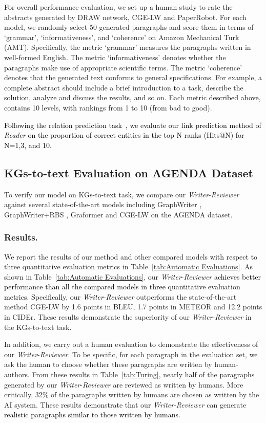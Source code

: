 \documentclass[letterpaper]{article}
\def\hmg{\textcolor{black}}
\def\wzq{\textcolor{black}}
\begin{document}
For overall performance evaluation, 
we set up a human study to rate the abstracts generated by DRAW network, CGE-LW and PaperRobot. 
For each model, we randomly select 50 generated paragraphs and score them in terms of {`grammar', `informativeness', and `coherence' on Amazon Mechanical Turk (AMT)}. 
Specifically, the metric `grammar' measures the paragraphs written in well-formed English. The metric `informativeness' denotes whether the paragraphs make use of appropriate scientific terms. The metric `coherence' denotes that the generated text conforms to general specifications. For example, a complete abstract should include a brief introduction \hmg{to} a task, describe the solution, analyze and discuss the results, and so on.
Each metric \hmg{described above}, contains 10 levels, \hmg{with} rankings from 1 to 10 (from bad to good). 

\hmg{Following the relation prediction task~\cite{Nathani2019LearningAE}, we evaluate our link prediction  method of \textit{Reader} on the proportion of correct entities in the top N ranks (Hits@N) for N=1,3, and 10.}

\subsection{KGs-to-text Evaluation on AGENDA Dataset}
To verify our model on KGs-to-text task, we compare our \textit{Writer}-\textit{Reviewer} against several state-of-the-art models including GraphWriter \cite{KoncelKedziorski2019TextGF}, GraphWriter+RBS \cite{An2019RepulsiveBS}, Graformer \cite{Schmitt2020ModelingGS} and CGE-LW \cite{ribeiro2020modeling} on the AGENDA dataset. 

\subsubsection{Results.} 
We report the results of our method and other compared models \hmg{with respect to} three quantitative evaluation metrics in Table~\ref{tab:Automatic Evaluations}. As shown in Table~\ref{tab:Automatic Evaluations},
our \textit{Writer}-\textit{Reviewer} \wzq{achieves better performance than all the compared models in three quantitative evaluation metrics.
Specifically, our \textit{Writer}-\textit{Reviewer}} outperforms the 
state-of-the-art method
CGE-LW by 1.6 points in BLEU, 1.7 points in METEOR and 12.2 points in CIDEr. 
These results demonstrate the superiority of our \textit{Writer}-\textit{Reviewer} in the KGs-to-text task.

In addition, we carry out a human evaluation to demonstrate the effectiveness of our \textit{Writer}-\textit{Reviewer}. 
To be specific, for each paragraph in the evaluation set, we ask the human to choose whether these paragraphs are written by human-authors.
From these results in Table~\ref{tab:Turing}, nearly half of the paragraphs generated by our \textit{Writer}-\textit{Reviewer} are reviewed as written by humans. More critically, 32\% of the paragraphs written by humans are chosen as written by the AI system. These results demonstrate that our \textit{Writer}-\textit{Reviewer} can generate \hmg{realistic paragraphs similar to those written by humans}.
\end{document}
